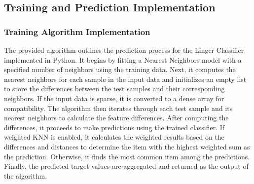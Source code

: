 \documentclass[a4paper, 12pt]{report}
\begin{document}
\subsection{Training and Prediction Implementation}
\subsubsection{Training Algorithm Implementation}
The provided algorithm outlines the prediction process for the Linger Classifier implemented in Python. 
It begins by fitting a Nearest Neighbors model with a specified number of neighbors using the training data. 
Next, it computes the nearest neighbors for each sample in the input data and initializes an empty list 
to store the differences between the test samples and their corresponding neighbors. 
If the input data is sparse, it is converted to a dense array for compatibility. 
The algorithm then iterates through each test sample and its nearest neighbors to calculate the feature differences. 
After computing the differences, it proceeds to make predictions using the trained classifier. 
If weighted KNN is enabled, it calculates the weighted results based on the differences and distances 
to determine the item with the highest weighted sum as the prediction. 
Otherwise, it finds the most common item among the predictions. 
Finally, the predicted target values are aggregated and returned as the output of the algorithm.
\end{document}
